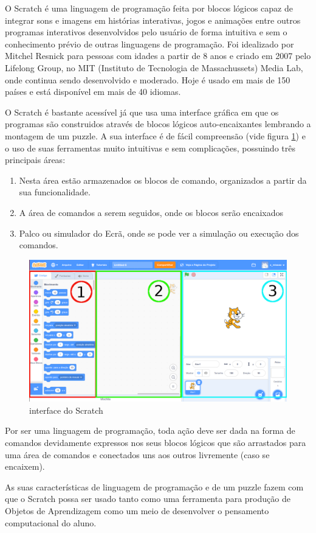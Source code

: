 \documentclass[12pt, openright, a4paper, brazil, openany, oneside]{abntex2}
\begin{document}
 O Scratch é uma linguagem de programação feita por blocos lógicos capaz de integrar sons e imagens em histórias interativas, jogos e animações entre outros programas interativos desenvolvidos pelo usuário de forma intuitiva e sem o conhecimento prévio de outras linguagens de programação. Foi idealizado por Mitchel Resnick para pessoas com idades a partir de 8 anos e criado em 2007 pelo Lifelong Group, no MIT (Instituto de Tecnologia de Massachussets) Media Lab, onde continua sendo desenvolvido e moderado.  Hoje é usado em mais de 150 países e está disponível em mais de 40 idiomas.
 
 O Scratch é bastante acessível já que usa uma interface gráfica em que os programas são construidos através de blocos lógicos auto-encaixantes lembrando a montagem de um puzzle. A sua interface é de fácil compreensão (vide figura \ref{scr1}) e o uso de suas ferramentas muito intuitivas e sem complicações, possuindo três principais áreas:
 
\begin{enumerate}
\item Nesta área estão armazenados os blocos de comando, organizados a partir da sua funcionalidade.
\item A área de comandos a serem seguidos, onde os blocos serão encaixados
\item Palco ou simulador do Ecrã, onde se pode ver a simulação ou execução dos comandos.
\end{enumerate}

\begin{figure}[h]

    \center

    \includegraphics[width=12cm]{scratch1.png}
    \caption{interface do Scratch \label{scr1}}
    
\end{figure}

 Por ser uma linguagem de programação, toda ação deve ser dada na forma de comandos devidamente expressos nos seus blocos lógicos que são arrastados para uma área de comandos e conectados uns aos outros livremente (caso se encaixem). 
 
 As suas características de linguagem de programação e de um puzzle fazem com que o Scratch possa ser usado tanto como uma ferramenta para produção de Objetos de Aprendizagem como um meio de desenvolver o pensamento computacional do aluno.




\end{document}
